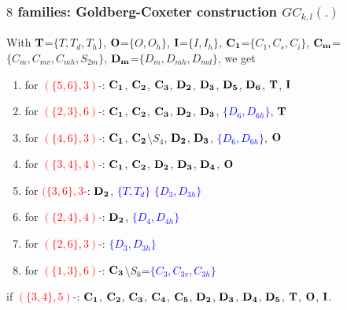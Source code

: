 \documentclass{beamer}
\begin{document}
\begin{frame}\frametitle{$8$ families: 
Goldberg-Coxeter construction  $GC_{k,l}(.)$}
\vspace{-3mm}
With
\textcolor{red}{${\bf T}$}=$\{T,T_d,T_h\}$, \textcolor{red}{${\bf O}$}=$\{O,O_h\}$,
\textcolor{red}{${\bf I}$}=$\{I,I_h\}$,
\textcolor{red}{${\bf C_1}$}=$\{C_1,C_s,C_i\}$,  
\textcolor{red}{${\bf C_m}$}=$\{C_m,C_{mv},C_{mh},S_{2m}\}$, 
 \textcolor{red}{${\bf D_m}$}=$\{D_m,D_{mh},D_{md}\}$,  
we get
\begin{enumerate}
\item
for \textcolor{red}{$(\{5,6\},3)$-}:
${\bf C_1}$,  ${\bf C_2}$, ${\bf C_3}$,  ${\bf D_2}$,  ${\bf D_3}$, ${\bf 
D_5}$,  ${\bf D_6}$, ${\bf T}$,  \textcolor{blue}{${\bf I}$}
\item
for \textcolor{red}{$(\{2, 3\},6)$-}: ${\bf C_1}$,
${\bf C_2}$, ${\bf C_3}$, ${\bf D_2}$, ${\bf D_3}$,
\textcolor{blue}{$\{D_6,D_{6h}\}$}, \textcolor{blue}{${\bf T}$}
\item
for \textcolor{red}{$(\{4,6\},3)$-}: ${\bf C_1}$, 
${\bf C_2}$$\setminus$$ S_{4}$, ${\bf D_2}$, ${\bf 
D_3}$,  \textcolor{blue}{$\{D_6,D_{6h}\}$}, \textcolor{blue}{${\bf O}$}
\item
for \textcolor{red}{$(\{3, 4\},4)$-}: ${\bf C_{1}}$,
${\bf C_2}$,  ${\bf D_2}$,
${\bf D_3}$, ${\bf D_4}$, \textcolor{blue}{${\bf O}$}
\item
for \textcolor{red}{$(\{3,6\},3$-}: ${\bf D_{2}}$, 
\textcolor{blue}{$\{T,T_d\}$} 
\textcolor{blue}{$\{D_3,D_{3h}\}$}
\item
for \textcolor{red}{$(\{2, 4\},4)$-}: ${\bf D_2}$,  
\textcolor{blue}{$\{D_4,D_{4h}\}$}
\item
for \textcolor{red}{$(\{2, 6\},3)$-}: 
\textcolor{blue}{$\{D_3,D_{3h}\}$}
\item
for \textcolor{red}{$(\{1, 3\},6)$-}:
${\bf C_3}$$\setminus$$ S_{6}$=\textcolor{blue}{$\{C_3,
C_{3v},C_{3h}\}$}
\end{enumerate}
if  \textcolor{red}{$(\{3,4\},5)$-}:
${\bf C_1}$,  ${\bf C_2}$, ${\bf C_3}$,  ${\bf C_4}$, ${\bf C_5}$, ${\bf D_2}$,  
${\bf D_3}$, ${\bf
D_4}$,  ${\bf D_5}$, ${\bf T}$,  ${\bf O}$, ${\bf I}$.



\end{frame}
\end{document}
